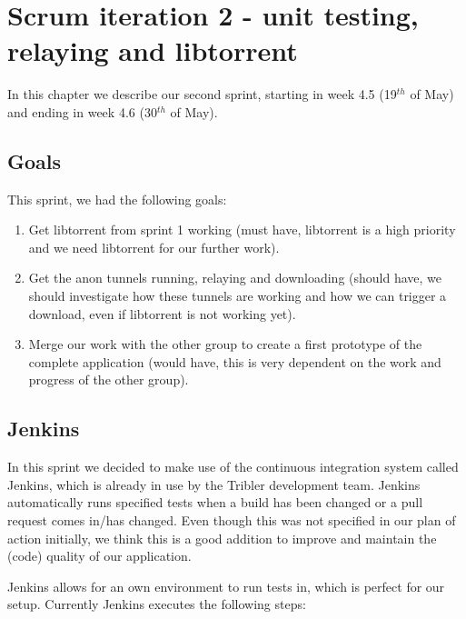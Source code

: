 \chapter{Scrum iteration 2 - unit testing, relaying and libtorrent}
\label{cpt:iteration2}
	In this chapter we describe our second sprint, starting in week 4.5 (19$^{th}$ of May) and ending in week 4.6 (30$^{th}$ of May).

	\section{Goals}
		This sprint, we had the following goals:
	
		\begin{enumerate}
			\item Get libtorrent from sprint 1 working (must have, libtorrent is a high priority and we need libtorrent for our further work).
			\item Get the anon tunnels running, relaying and downloading (should have, we should investigate how these tunnels are working and how we can trigger a download, even if libtorrent is not working yet).
			\item Merge our work with the other group to create a first prototype of the complete application (would have, this is very dependent on the work and progress of the other group).
		\end{enumerate}
	
	\section{Jenkins}
		\label{sec:jenkins}
		In this sprint we decided to make use of the continuous integration system called Jenkins, which is already in use by the Tribler development team. Jenkins automatically runs specified tests when a build has been changed or a pull request comes in/has changed. 
		Even though this was not specified in our plan of action initially, we think this is a good addition to improve and maintain the (code) quality of our application.
		
		Jenkins allows for an own environment to run tests in, which is perfect for our setup. Currently Jenkins executes the following steps:
		

